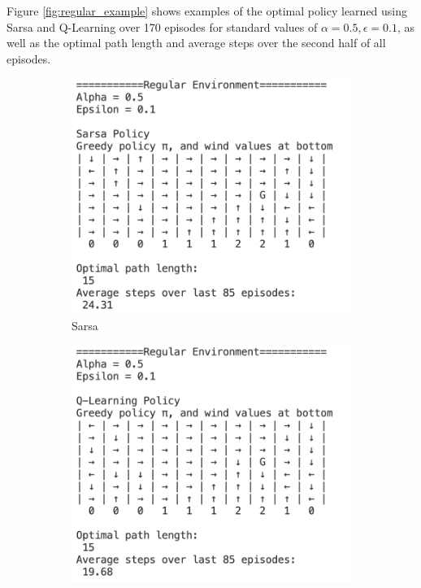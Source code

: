 \documentclass{article}
\begin{document}
Figure \ref{fig:regular_example} shows examples of the optimal policy learned using Sarsa and Q-Learning over 170 episodes for standard values of $\alpha = 0.5, \epsilon = 0.1$, as well as the optimal path length and average steps over the second half of all episodes. 

\begin{figure}[h!]
  \centering
  \begin{subfigure}{0.4\textwidth} 
    \includegraphics[width=\textwidth]{sarsa_regular_example.png}
    \caption{Sarsa}
  \end{subfigure}
  \hspace{0.05\textwidth}  
  \begin{subfigure}{0.4\textwidth}  
    \includegraphics[width=\textwidth]{q_regular_example.png}

\end{subfigure}
\end{figure}
\end{document}
